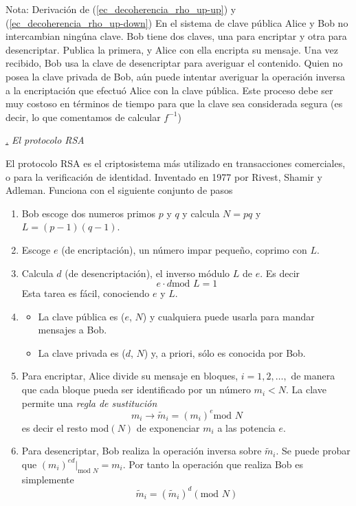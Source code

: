 \documentclass[a4paper,11pt]{book} %
\numberwithin{equation}{chapter}
\def\subsubiContadorIt{\par\addtocounter{subsubsection}{1}\underline{\it\thesubsubsection.}\hskip0.5cm \setcounter{subsubsubsectionIt}{0}}
\newcommand{\SubsubiIt}[1]{
		\subsubiContadorIt \textit{#1}
	}
\newcounter{subsubsubsectionIt}[subsubsection]
\begin{document}
\begin{mybox_blue}{Nota: Derivación de (\ref{ec_decoherencia_rho_up-up}) y  (\ref{ec_decoherencia_rho_up-down})}
	En el sistema de clave pública Alice y Bob no intercambian ningúna clave. Bob tiene dos claves, una para encriptar y otra para desencriptar. Publica la primera, y Alice con ella encripta su mensaje.
Una vez recibido, Bob usa la clave de desencriptar para averiguar el contenido. Quien no posea la clave privada de Bob, aún puede intentar averiguar la operación inversa a la encriptación que efectuó Alice con la clave pública. Este proceso debe ser muy costoso en términos de tiempo para que la clave sea considerada segura (es decir, lo que comentamos de calcular $f^{-1}$)


			\SubsubiIt{El protocolo RSA}
	
El protocolo RSA es el criptosistema más utilizado en transacciones comerciales, o para la verificación de identidad. Inventado en 1977 por Rivest, Shamir y Adleman. Funciona con el siguiente conjunto de pasos
\begin{enumerate}
	\item Bob escoge dos numeros primos $p$ y $q$ y calcula $N = pq$ y $L = (p - 1)(q - 1)$.
	\item Escoge $e$ (de encriptación), un número impar pequeño, coprimo con $L$.
	\item Calcula $d$ (de desencriptación), el inverso módulo $L$ de $e$. Es decir
		\begin{equation}
		e \cdot d \text{mod }L = 1
		\end{equation}
	Esta tarea es fácil, conociendo $e$ y $L$.
	\item 
	\begin{itemize}
		\item La clave pública es ($e$, $N$) y cualquiera puede usarla para mandar mensajes a Bob.
		\item La clave privada es ($d$, $N$) y, a priori, sólo es conocida por Bob.
	\end{itemize}
	\item Para encriptar, Alice divide su mensaje en bloques, $i = 1, 2, \dots,$ de manera que cada bloque pueda ser identificado por un número $m_i < N$. La clave permite una \textit{regla de sustitución}
		\begin{equation}
		m_i \rightarrow \tilde{m}_i = (m_i)^e \text{mod } N
		\end{equation}
		es decir el resto mod$(N)$ de exponenciar $m_i$ a las potencia $e$.
	\item  Para desencriptar, Bob realiza la operación inversa sobre $\tilde{m}_i$. Se puede probar que $(m_i)^{ed}|_{\text{mod }N} = m_i$. Por tanto la operación que realiza Bob es simplemente
		\begin{equation}
		\tilde{m}_i = (\tilde{m}_i)^d (\text{mod }N)
		\end{equation}
\end{enumerate}


\end{mybox_blue}
\end{document}
